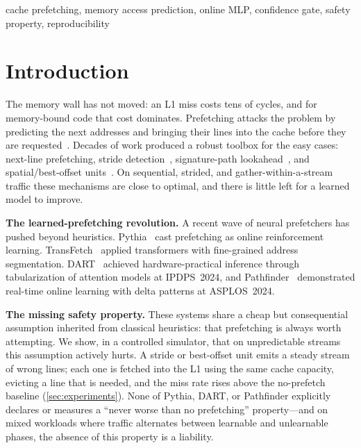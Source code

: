 \documentclass[conference]{IEEEtran}
\begin{document}
\begin{IEEEkeywords}
cache prefetching, memory access prediction, online MLP, confidence gate, safety property, reproducibility
\end{IEEEkeywords}

\section{Introduction}
\label{sec:intro}

The memory wall has not moved: an L1 miss costs tens of cycles, and for memory-bound
code that cost dominates. Prefetching attacks the problem by predicting the next
addresses and bringing their lines into the cache before they are requested~\cite{wulf1995,chen1995}.
Decades of work produced a robust toolbox for the easy cases: next-line prefetching,
stride detection~\cite{chen1995}, signature-path lookahead~\cite{kim2016spp}, and
spatial/best-offset units~\cite{michaud2016bop}. On sequential, strided, and
gather-within-a-stream traffic these mechanisms are close to optimal, and there is
little left for a learned model to improve.

\textbf{The learned-prefetching revolution.}
A recent wave of neural prefetchers has pushed beyond heuristics.
Pythia~\cite{pythia} cast prefetching as online reinforcement learning.
TransFetch~\cite{transfetch} applied transformers with fine-grained address segmentation.
DART~\cite{dart} achieved hardware-practical inference through
tabularization of attention models at IPDPS~2024, and
Pathfinder~\cite{pathfinder} demonstrated real-time
online learning with delta patterns at ASPLOS~2024.

\textbf{The missing safety property.}
These systems share a cheap but consequential assumption inherited from classical
heuristics: that prefetching is always worth attempting. We show, in a controlled
simulator, that on unpredictable streams this assumption actively hurts. A stride or
best-offset unit emits a steady stream of wrong lines; each one is fetched into the
L1 using the same cache capacity, evicting a line that is needed, and the miss rate
rises above the no-prefetch baseline (\cref{sec:experiments}). None of
Pythia, DART, or Pathfinder explicitly declares or measures a ``never worse
than no prefetching'' property---and on mixed workloads where traffic alternates
between learnable and unlearnable phases, the absence of this property is a liability.
\end{document}
